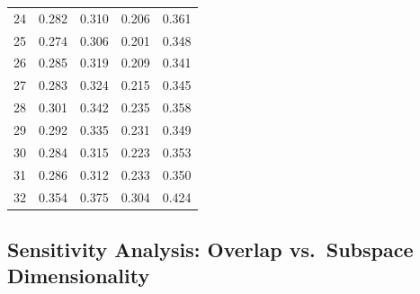 \documentclass{article}
\begin{document}
\begin{longtable}{c cccc}
24 & 0.282 & 0.310 & 0.206 & 0.361 \\
25 & 0.274 & 0.306 & 0.201 & 0.348 \\
26 & 0.285 & 0.319 & 0.209 & 0.341 \\
27 & 0.283 & 0.324 & 0.215 & 0.345 \\
28 & 0.301 & 0.342 & 0.235 & 0.358 \\
29 & 0.292 & 0.335 & 0.231 & 0.349 \\
30 & 0.284 & 0.315 & 0.223 & 0.353 \\
31 & 0.286 & 0.312 & 0.233 & 0.350 \\
32 & 0.354 & 0.375 & 0.304 & 0.424 \\
\end{longtable}

\subsection{Sensitivity Analysis: Overlap vs.\ Subspace Dimensionality}
\label{app:sensitivity_full}
\end{document}
